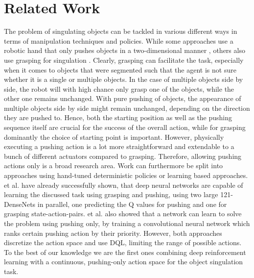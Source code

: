 \documentclass{article}
\begin{document}
\section{Related Work}
\label{sec:rel-work}
The problem of singulating objects can be tackled in various different ways in terms of manipulation techniques and policies. While some approaches use a robotic hand that only pushes objects in a two-dimensional manner \citep{guided_pushing}, others also use grasping for singulation \citep{interactive_singulation}. Clearly, grasping can facilitate the task, especially when it comes to objects that were segmented such that the agent is not sure whether it is a single or multiple objects. In the case of multiple objects side by side, the robot will with high chance only grasp one of the objects, while the other one remains unchanged. With pure pushing of objects, the appearance of multiple objects side by side might remain unchanged, depending on the direction they are pushed to. Hence, both the starting position as well as the pushing sequence itself are crucial for the success of the overall action, while for grasping dominantly the choice of starting point is important. However, physically executing a pushing action is a lot more straightforward and extendable to a bunch of different actuators compared to grasping. Therefore, allowing pushing actions only is a broad research area. 
\newline
Work can furthermore be split into approaches using hand-tuned deterministic policies or learning based approaches. \citeauthor{drl_synergies} et al. \citep{drl_synergies} have already successfully shown, that deep neural networks are capable of learning the discussed task using grasping and pushing, using two large 121-DenseNets in parallel, one predicting the Q values for pushing and one for grasping state-action-pairs. \citeauthor{push_proposal} et al. \citep{push_proposal} also showed that a network can learn to solve the problem using pushing only, by training a convolutional neural network which ranks certain pushing action by their priority. However, both approaches discretize the action space and use DQL, limiting the range of possible actions. To the best of our knowledge we are the first ones combining deep reinforcement learning with a continuous, pushing-only action space for the object singulation task. 
\newline
\end{document}
